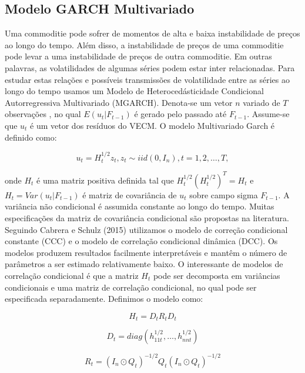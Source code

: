 \documentclass[a4paper,12pt] {article}
\begin{document}
  
  \subsection{Modelo GARCH Multivariado} 
 
 
 Uma commoditie pode  sofrer de momentos de alta e baixa instabilidade de preços ao longo do tempo. Além disso, a instabilidade de preços de uma commoditie pode levar a uma instabilidade de preços de outra commoditie. Em outras palavras, as volatilidades de algumas séries podem estar inter relacionadas.  Para estudar estas relações  e possíveis transmissões  de volatilidade entre as séries ao longo do tempo usamos um Modelo de Heterocedásticidade Condicional Autorregressiva Multivariado (MGARCH). 
 Denota-se um vetor $n$ variado de $T$ observações , no qual $E(u_t|F_{t-1})$ é gerado pelo passado até $F_{t-1}$. Assume-se que $u_t$ é um vetor dos resíduos do VECM. O modelo Multivariado Garch é definido como:
 
   \begin{equation}
   u_t=H_{t}^{1/2} z_t,  z_t \sim iid(0,I_n), t=1,2,\dots,T,
   \end{equation}
 
  onde $H_t$ é uma matriz positiva definida tal que $H_{t}^{1/2}(H_{t}^{1/2})^T=H_t$ e $H_t=Var(u_t|F_{t-1})$ é  matriz de covariância de $u_t$ sobre campo sigma $F_{t-1}$. A variância não condicional é assumida constante ao longo do tempo. Muitas especificações da matriz de covariância condicional são propostas na literatura. Seguindo Cabrera e Schulz (2015) utilizamos o modelo de correção condicional constante (CCC) e o   modelo de correlação condicional dinâmica (DCC). Os modelos produzem resultados facilmente interpretáveis e mantêm o número de parâmetros a ser estimado relativamente baixo. O interessante de modelos de correlação condicional é que a matriz $H_t$ pode ser decomposta em variâncias condicionais e uma matriz de correlação condicional, no qual pode ser especificada separadamente. Definimos o modelo como:
  
    \begin{equation}
    H_{t}=D_t R_t D_t
    \end{equation}
  
     \begin{equation}
     D_{t}=diag(h_{1 1t}^{1/2},\dots,h_{n nt}^{1/2})
     \end{equation}
 
  \begin{equation}
  R_{t}=(I_n \odot Q_t)^{-1/2} Q_t(I_n \odot Q_t)^{-1/2}
  \end{equation}
 
\end{document}
